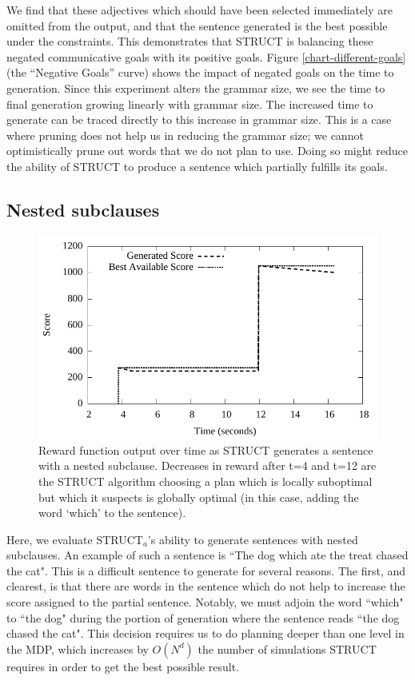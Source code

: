 We find that these adjectives which
should have been selected immediately are omitted from the output, and
that the sentence generated is the best possible under the
constraints.  This demonstrates that STRUCT is balancing these negated
communicative goals with its positive goals.  Figure
\ref{chart-different-goals} (the ``Negative Goals'' curve) shows the
impact of negated goals on the time to generation.  Since this
experiment alters the grammar size, we see the time to final
generation growing linearly with grammar size.  The increased time to
generate can be traced directly to this increase in grammar size.
This is a case where pruning does not help us in reducing the grammar size;
we cannot optimistically prune out words that we do not plan to use.  Doing
so might reduce the ability of STRUCT to produce a sentence which partially
fulfills its goals.

\subsection{Nested subclauses}

\begin{figure}
\centering
\includegraphics[width=0.7\linewidth]{../analysis/struct/nested/nested.pdf}
\caption{Reward function output over time as STRUCT generates a sentence with a nested subclause.
Decreases in reward after t=4 and t=12 are the STRUCT algorithm choosing a plan which is locally suboptimal
but which it suspects is globally optimal (in this case, adding the word `which' to the sentence).}
\label{nested}
\end{figure}

Here, we evaluate STRUCT$_a$'s ability to generate sentences with nested
subclauses.  An example of such a sentence is ``The dog which ate the treat
chased the cat".  This is a difficult sentence to generate for several reasons.
The first, and clearest, is that there are words in the sentence which do not
help to increase the score assigned to the partial sentence.  Notably, we must adjoin
the word ``which" to ``the dog" during the portion of generation where the
sentence reads ``the dog chased the cat".  This decision requires us to do planning
deeper than one level in the MDP, which increases by $O(N^d)$ the number of simulations
STRUCT requires in order to get the best possible result.

